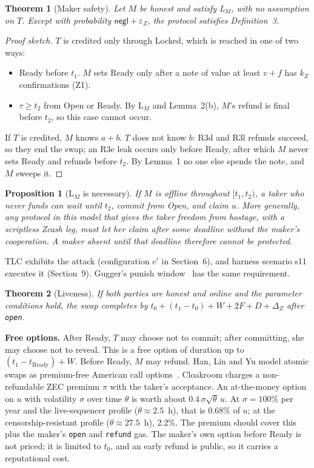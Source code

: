 \documentclass[10pt,letterpaper]{article}
\theoremstyle{plain}
\newtheorem{theorem}{Theorem}
\newtheorem{proposition}{Proposition}
\theoremstyle{definition}
\newcommand{\fn}[1]{\texttt{#1}}
\newcommand{\st}[1]{\textsf{#1}}
\begin{document}
\begin{theorem}[Maker safety]
Let $M$ be honest and satisfy L$_M$, with no assumption on $T$. Except with probability
$\mathsf{negl}+\varepsilon_Z$, the protocol satisfies Definition~3.
\end{theorem}
\begin{proof}[Proof sketch]
$T$ is credited only through \st{Locked}, which is reached in one of two ways:
\begin{itemize}\setlength\itemsep{0.05em}
\item \st{Ready} before $t_1$. $M$ sets Ready only after a note of value at least $v+f$ has $k_Z$
confirmations (Z1).
\item $\tau \ge t_2$ from \st{Open} or \st{Ready}. By L$_M$ and Lemma~2(b), $M$'s refund is final
before $t_2$, so this case cannot occur.
\end{itemize}
If $T$ is credited, $M$ knows $a+b$. $T$ does not know $b$: R3d and R3l refunds succeed, so they
end the swap; an R3e leak occurs only before Ready, after which $M$ never sets Ready and refunds
before $t_2$. By Lemma~1 no one else spends the note, and $M$ sweeps it.
\end{proof}

\begin{proposition}[L$_M$ is necessary]
If $M$ is offline throughout $[t_1, t_2)$, a taker who never funds can wait until $t_2$, commit
from \st{Open}, and claim $u$. More generally, any protocol in this model that gives the taker
freedom from hostage, with a scriptless Zcash leg, must let her claim after some deadline
without the maker's cooperation. A maker absent until that deadline therefore cannot be
protected.
\end{proposition}
TLC exhibits the attack (configuration c$'$ in Section~6), and harness scenario s11 executes it
(Section~9). Gugger's punish window~\cite{gugger} has the same requirement.

\begin{theorem}[Liveness]
If both parties are honest and online and the parameter conditions hold, the swap completes by
$t_0 + (t_1 - t_0) + W + 2F + D + \Delta_Z$ after \fn{open}.
\end{theorem}

\textbf{Free options.} After Ready, $T$ may choose not to commit; after committing, she may choose
not to reveal. This is a free option of duration up to $(t_1 - t_{\mathrm{Ready}}) + W$. Before
Ready, $M$ may refund. Han, Lin and Yu model atomic swaps as premium-free American call
options~\cite{optionality}. Cloakroom charges a non-refundable ZEC premium $\pi$ with the taker's
acceptance. An at-the-money option on $u$ with volatility $\sigma$ over time $\theta$ is worth about
$0.4\,\sigma\sqrt{\theta}\,u$. At $\sigma = 100\%$ per year and the live-sequencer profile
($\theta \approx 2.5$~h), that is $0.68\%$ of $u$; at the censorship-resistant profile
($\theta \approx 27.5$~h), $2.2\%$. The premium should cover this plus the maker's \fn{open} and
\fn{refund} gas. The maker's own option before Ready is not priced; it is limited to $t_0$, and an
early refund is public, so it carries a reputational cost.
\end{document}
